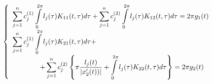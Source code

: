 \documentclass{beamer}
\numberwithin{equation}{section}
\newcommand{\intl}{\int\limits}
\newcommand{\inttwopi}{\intl_{0}^{2\pi}}
\begin{document}

	\begin{comment}
	Область D поділяється на підобласті і шукана функція апроксимується алгебраїчними поліномами невисокого степеня в межах підобласті.
	
	Маємо рівновіддалений поділ відрізка [a, b]
	і простір неперервних на [a, b] функцій  звуження яких на підінтервал  є лінійна ф-ція 
	
	3 очевидними уточненнями для $l_{0}$ i $l_{n} .$ 
	?уточнення на кінцях [a, b]
	\end{comment}

	\begin{frame}
		
		$$
		\hspace{-0.3cm}
		\left\{
		\begin{array}{l}
			\displaystyle
			\sum_{j=1}^{n} c^{(1)}_{j} \inttwopi l_{j}(\tau) K_{11}(t, \tau) d \tau
			+ \sum_{j=1}^{n} c^{(2)}_{j} \inttwopi l_{j}(\tau) K_{12}(t, \tau) d \tau
			= 2\pi g_{1}(t)
			\\ [0.3cm]
			
			\displaystyle
			\sum_{j=1}^{n} c^{(1)}_{j} \inttwopi l_{j}(\tau) K_{21}(t, \tau) d \tau +
			\\ [0.3cm]
			
			\displaystyle
			\qquad \qquad
			+ \sum_{j=1}^{n} c^{(2)}_{j} \left\{
			\pi \frac{l_{j}(t)}{\abs{x'_{2}(t))}}
			+ \inttwopi l_{j}(\tau) K_{22}(t, \tau) d \tau
			\right\}
			= 2\pi g_{2}(t)
		\end{array}\right.
		$$
		

	\end{frame}
	\begin{comment}
	$$
	\begin{matrix}
	G^{(1)}_{ji} = \inttwopi l_{j}(\tau) K_{11}(t_i, \tau) d \tau \\[0.8cm]
	G^{(2)}_{ji} = \inttwopi l_{j}(\tau) K_{12}(t_i, \tau) d \tau \\[0.8cm]
	G^{(3)}_{ji} = \inttwopi l_{j}(\tau) K_{21}(t_i, \tau) d \tau \\[0.8cm]
	G^{(4)}_{ji} = \pi\frac{ l_{j}(t_i)}{\abs{x'_{2}(t_i))}}
	+ \inttwopi l_{j}(\tau) K_{22}(t_i, \tau) d \tau \\
	\end{matrix}
	$$
	\end{comment}
\end{document}
